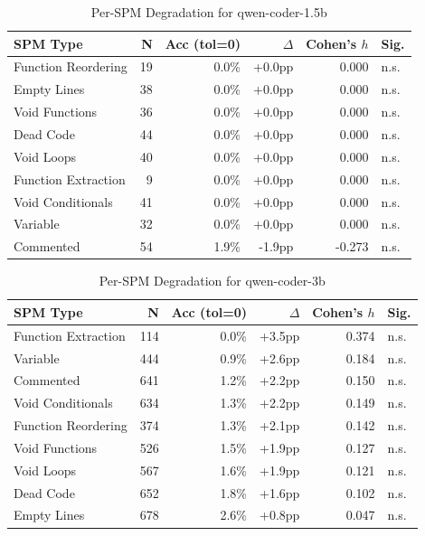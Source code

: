 \begin{table}[h]
\centering
\caption{Per-SPM Degradation for qwen-coder-1.5b}
\label{tab:per_spm_qwen-coder-1.5b}
\begin{tabular}{lrrrrl}
\toprule
SPM Type & N & Acc (tol=0) & $\Delta$ & Cohen's $h$ & Sig. \\
\midrule
Function Reordering & 19 & 0.0\% & +0.0pp & 0.000 & n.s. \\
Empty Lines & 38 & 0.0\% & +0.0pp & 0.000 & n.s. \\
Void Functions & 36 & 0.0\% & +0.0pp & 0.000 & n.s. \\
Dead Code & 44 & 0.0\% & +0.0pp & 0.000 & n.s. \\
Void Loops & 40 & 0.0\% & +0.0pp & 0.000 & n.s. \\
Function Extraction & 9 & 0.0\% & +0.0pp & 0.000 & n.s. \\
Void Conditionals & 41 & 0.0\% & +0.0pp & 0.000 & n.s. \\
Variable & 32 & 0.0\% & +0.0pp & 0.000 & n.s. \\
Commented & 54 & 1.9\% & -1.9pp & -0.273 & n.s. \\
\bottomrule
\end{tabular}
\end{table}

\begin{table}[h]
\centering
\caption{Per-SPM Degradation for qwen-coder-3b}
\label{tab:per_spm_qwen-coder-3b}
\begin{tabular}{lrrrrl}
\toprule
SPM Type & N & Acc (tol=0) & $\Delta$ & Cohen's $h$ & Sig. \\
\midrule
Function Extraction & 114 & 0.0\% & +3.5pp & 0.374 & n.s. \\
Variable & 444 & 0.9\% & +2.6pp & 0.184 & n.s. \\
Commented & 641 & 1.2\% & +2.2pp & 0.150 & n.s. \\
Void Conditionals & 634 & 1.3\% & +2.2pp & 0.149 & n.s. \\
Function Reordering & 374 & 1.3\% & +2.1pp & 0.142 & n.s. \\
Void Functions & 526 & 1.5\% & +1.9pp & 0.127 & n.s. \\
Void Loops & 567 & 1.6\% & +1.9pp & 0.121 & n.s. \\
Dead Code & 652 & 1.8\% & +1.6pp & 0.102 & n.s. \\
Empty Lines & 678 & 2.6\% & +0.8pp & 0.047 & n.s. \\
\bottomrule
\end{tabular}
\end{table}

